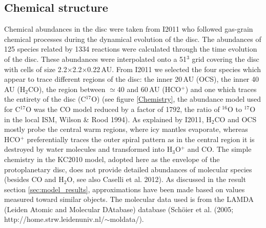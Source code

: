 \documentclass[useAMS,usenatbib]{mn2e}
\begin{document}
\subsection{Chemical structure} \label{subsec:chemical_structure}
Chemical abundances in the disc were taken from I2011 who followed gas-grain chemical processes during the dynamical evolution of the disc. The abundances of 125 species related by 1334 reactions were calculated through the time evolution of the disc. These abundances were interpolated onto a 51$^3$ grid covering the disc with cells of size 2.2$\times$2.2$\times$0.22$\,$AU.  From I2011 we selected the four species which appear to trace different regions of the disc: the inner 20\,AU (OCS), the inner 40\,AU (H$_2$CO),  the region between $\simeq$40 and 60\,AU (HCO$^+$) and one which traces the entirety of the disc (C$^{17}$O) (see figure \ref{Chemistry}, the abundance model used for C$^{17}$O was the CO model reduced by a factor of 1792, the ratio of $^{16}$O to $^{17}$O in the local ISM, Wilson \& Rood 1994). As explained by I2011,  H$_2$CO and OCS mostly probe the central warm regions, where icy mantles evaporate, whereas HCO$^+$ preferentially traces the outer spiral pattern as in the central region it is destroyed by water molecules and transformed into H$_3$O$^+$ and CO. The simple chemistry in the KC2010 model, adopted here as the envelope of the protoplanetary disc, does not provide detailed abundances of molecular species (besides CO and H$_2$O, see also Caselli et al. 2012). As discussed in the result section \ref{sec:model_results}, approximations have been made based on values measured toward similar objects. The molecular data used is from the LAMDA (Leiden Atomic and Molecular DAtabase) database (Sch\"oier et al. (2005; http://home.strw.leidenuniv.nl/$\sim$moldata/).
\end{document}
